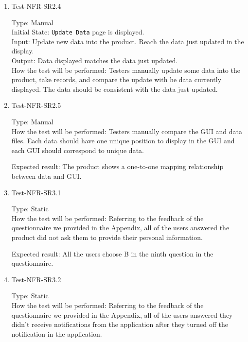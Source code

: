 \documentclass[12pt, titlepage]{article}
\begin{document}
\begin{enumerate}
\item{Test-NFR-SR2.4\\}

Type: Manual\\

Initial State: \verb|Update Data| page is displayed.\\

Input: Update new data into the product. Reach the data just updated in the display.\\

Output: Data displayed matches the data just updated.\\

How the test will be performed: Testers manually update some data into the product, take records, and compare the update with he data currently displayed. The data should be consistent with the data just updated.

\item{Test-NFR-SR2.5\\}

Type: Manual\\

How the test will be performed: Testers manually compare the GUI and data files. Each data should have one unique position to display in the GUI and each GUI should correspond to unique data. 

Expected result: The product shows a one-to-one mapping relationship between data and GUI. 



\item{Test-NFR-SR3.1\\}

Type: Static\\

How the test will be performed: Referring to the feedback of the questionnaire we provided in the Appendix, all of the users answered the product did not ask them to provide their personal information.

Expected result: All the users choose B in the ninth question in the questionnaire.

\item{Test-NFR-SR3.2\\}

Type: Static\\

How the test will be performed: Referring to the feedback of the questionnaire we provided in the Appendix, all of the users answered they didn't receive notifications from the application after they turned off the notification in the application.\\


\end{enumerate}
\end{document}
